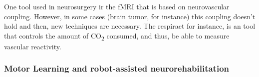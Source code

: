 \documentclass[12pt,article,oneside,a4paper]{memoir}
\begin{document}
\begin{enumerate}
One tool used in neurosurgery ir the fMRI that is based on neurovascular
coupling. However, in some cases (brain tumor, for instance) this coupling
doesn't hold and then, new techniques are necessary.
The respiract for instance, is an tool that controls the amount of
CO\textsubscript{2} consumed, and thus, be able to measure vascular reactivity.

\end{enumerate}

\subsubsection{Motor Learning and robot-assisted neurorehabilitation}
\end{document}
